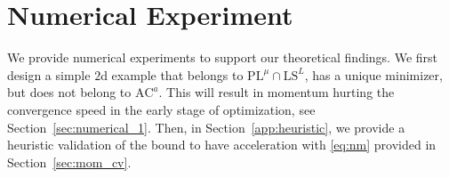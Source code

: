 \documentclass{article}
\newcommand{\jh}[1]{{\color{red} #1}}
\def\pl{{\text{PL}^\mu}}
\newcommand{\ls}{\text{LS}^{L}}
\newcommand{\ac}{\text{AC}^{a}}
\theoremstyle{plain}
\theoremstyle{definition}
\theoremstyle{remark}
\begin{document}
  
\section{Numerical Experiment}\label{sec:numerical}
We provide numerical experiments to support our theoretical findings. We first design a simple $2$d example that belongs to $\pl \cap \ls$, has a unique minimizer, but does not belong to $\ac$. This will result in momentum hurting the convergence speed in the early stage of optimization, see Section~\ref{sec:numerical_1}. Then, in Section~\ref{app:heuristic}, we provide a heuristic validation of the bound to have acceleration with \eqref{eq:nm} provided in Section~\ref{sec:mom_cv}.




\end{document}
